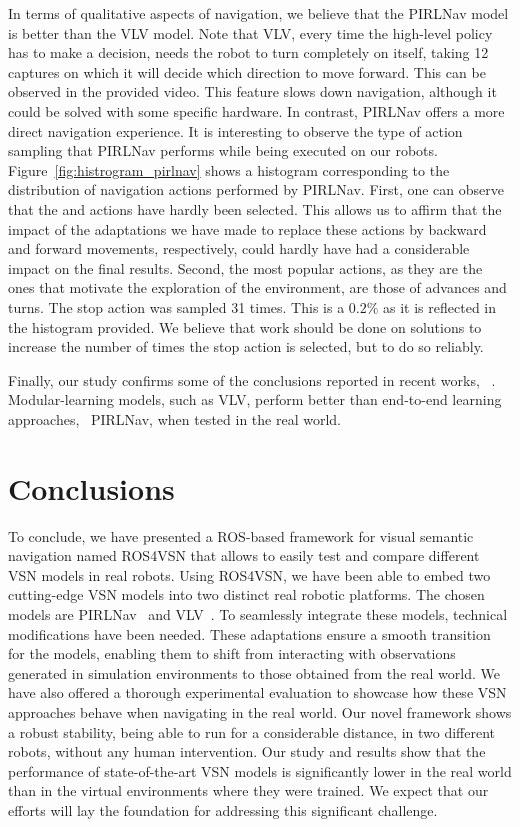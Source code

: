 In terms of qualitative aspects of navigation, we believe that the PIRLNav model is better than the VLV model.
Note that VLV, every time the high-level policy has to make a decision, needs the robot to turn completely on itself, taking 12 captures on which it will decide which direction to move forward.
This can be observed in the provided video.
This feature slows down navigation, although it could be solved with some specific hardware.
In contrast, PIRLNav offers a more direct navigation experience.
It is interesting to observe the type of action sampling that PIRLNav performs while being executed on our robots.
Figure~\ref{fig:histrogram_pirlnav} shows a histogram corresponding to the distribution of navigation actions performed by PIRLNav.
First, one can observe that the \lookup and \lookdown actions have hardly been selected.
This allows us to affirm that the impact of the adaptations we have made to replace these actions by backward and forward movements, respectively, could hardly have had a considerable impact on the final results.
Second, the most popular actions, as they are the ones that motivate the exploration of the environment, are those of advances and turns.
The stop action was sampled 31 times.
This is a $0.2\%$ as it is reflected in the histogram provided.
We believe that work should be done on solutions to increase the number of times the stop action is selected, but to do so reliably.

Finally, our study confirms some of the conclusions reported in recent works, \eg~\cite{gervet2022}.
Modular-learning models, such as VLV, perform better than end-to-end learning approaches, \eg~PIRLNav, when tested in the real world.

\section{Conclusions}\label{sec:conclusions}
To conclude, we have presented a ROS-based framework for visual semantic navigation named ROS4VSN that allows to easily test and compare different VSN models in real robots.
Using ROS4VSN, we have been able to embed two cutting-edge VSN models into two distinct real robotic platforms.
The chosen models are PIRLNav~\cite{ramrakhya2023} and VLV~\cite{chang2020}.
To seamlessly integrate these models, technical modifications have been needed.
These adaptations ensure a smooth transition for the models, enabling them to shift from interacting with observations generated in simulation environments to those obtained from the real world.
We have also offered a thorough experimental evaluation to showcase how these VSN approaches behave when navigating in the real world.
Our novel framework shows a robust stability, being able to run for a considerable distance, in two different robots, without any human intervention.
Our study and results show that the performance of state-of-the-art VSN models is significantly lower in the real world than in the virtual environments where they were trained.
We expect that our efforts will lay the foundation for addressing this significant challenge.


